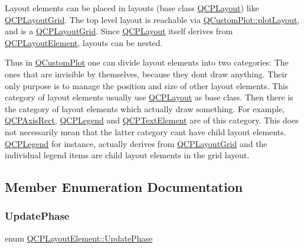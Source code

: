 Layout elements can be placed in layouts (base class \mbox{\hyperlink{class_q_c_p_layout}{Q\+C\+P\+Layout}}) like \mbox{\hyperlink{class_q_c_p_layout_grid}{Q\+C\+P\+Layout\+Grid}}. The top level layout is reachable via \mbox{\hyperlink{class_q_custom_plot_af1a1f1f571237deb7c2bd34a5e9f018f}{Q\+Custom\+Plot\+::plot\+Layout}}, and is a \mbox{\hyperlink{class_q_c_p_layout_grid}{Q\+C\+P\+Layout\+Grid}}. Since \mbox{\hyperlink{class_q_c_p_layout}{Q\+C\+P\+Layout}} itself derives from \mbox{\hyperlink{class_q_c_p_layout_element}{Q\+C\+P\+Layout\+Element}}, layouts can be nested.

Thus in \mbox{\hyperlink{class_q_custom_plot}{Q\+Custom\+Plot}} one can divide layout elements into two categories\+: The ones that are invisible by themselves, because they don\textquotesingle{}t draw anything. Their only purpose is to manage the position and size of other layout elements. This category of layout elements usually use \mbox{\hyperlink{class_q_c_p_layout}{Q\+C\+P\+Layout}} as base class. Then there is the category of layout elements which actually draw something. For example, \mbox{\hyperlink{class_q_c_p_axis_rect}{Q\+C\+P\+Axis\+Rect}}, \mbox{\hyperlink{class_q_c_p_legend}{Q\+C\+P\+Legend}} and \mbox{\hyperlink{class_q_c_p_text_element}{Q\+C\+P\+Text\+Element}} are of this category. This does not necessarily mean that the latter category can\textquotesingle{}t have child layout elements. \mbox{\hyperlink{class_q_c_p_legend}{Q\+C\+P\+Legend}} for instance, actually derives from \mbox{\hyperlink{class_q_c_p_layout_grid}{Q\+C\+P\+Layout\+Grid}} and the individual legend items are child layout elements in the grid layout. 

\subsection{Member Enumeration Documentation}
\mbox{\label{class_q_c_p_layout_element_a0d83360e05735735aaf6d7983c56374d}} 
\subsubsection{\texorpdfstring{Update\+Phase}{UpdatePhase}}
{\footnotesize\ttfamily enum \mbox{\hyperlink{class_q_c_p_layout_element_a0d83360e05735735aaf6d7983c56374d}{Q\+C\+P\+Layout\+Element\+::\+Update\+Phase}}}

